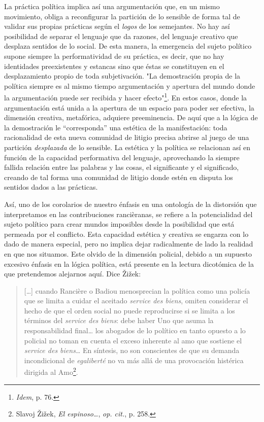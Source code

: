 \documentclass{book}
\begin{document}
La práctica política implica así una argumentación que, en un mismo
movimiento, obliga a reconfigurar la partición de lo sensible de forma
tal de validar sus propias prácticas según el \emph{logos} de los
semejantes. No hay así posibilidad de separar el lenguaje que da
razones, del lenguaje creativo que desplaza sentidos de lo social. De
esta manera, la emergencia del sujeto político supone siempre la
performatividad de su práctica, es decir, que no hay identidades
preexistentes y estancas sino que éstas se constituyen en el
desplazamiento propio de toda subjetivación. "La demostración propia de
la política siempre es al mismo tiempo argumentación y apertura del
mundo donde la argumentación puede ser recibida y hacer
efecto"\footnote{\emph{Idem}, p. 76.}. En estos casos, donde la
argumentación está unida a la apertura de un espacio para poder ser
efectiva, la dimensión creativa, metafórica, adquiere preeminencia. De
aquí que a la lógica de la demostración le ``corresponda'' una estética
de la manifestación: toda racionalidad de esta nueva comunidad de
litigio precisa abrirse al juego de una partición \emph{desplazada} de
lo sensible. La estética y la política se relacionan así en función de
la capacidad performativa del lenguaje, aprovechando la siempre fallida
relación entre las palabras y las cosas, el significante y el
significado, creando de tal forma una comunidad de litigio donde estén
en disputa los sentidos dados a las prácticas.

Así, uno de los corolarios de nuestro énfasis en una ontología de la
distorsión que interpretamos en las contribuciones rancièranas, se
refiere a la potencialidad del sujeto político para crear mundos
imposibles desde la posibilidad que está permeada por el conflicto. Esta
capacidad estética y creativa se engarza con lo dado de manera especial,
pero no implica dejar radicalmente de lado la realidad en que nos
situamos. Este olvido de la dimensión policial, debido a un supuesto
excesivo énfasis en la lógica política, está presente en la lectura
dicotómica de la que pretendemos alejarnos aquí. Dice Žižek:

\begin{quote}
{[}\ldots{]} cuando Rancière o Badiou menosprecian la política como una
policía que se limita a cuidar el aceitado \emph{service des biens},
omiten considerar el hecho de que el orden social no puede reproducirse
si se limita a los términos del \emph{service des biens}: debe haber Uno
que asuma la responsabilidad final\ldots{} los abogados de lo político
en tanto opuesto a lo policial no toman en cuenta el exceso inherente al
amo que sostiene el \emph{service des biens}\ldots{} En síntesis, no son
conscientes de que su demanda incondicional de \emph{egaliberté} no va
más allá de una provocación histérica dirigida al Amo\footnote{Slavoj
  Žižek, \emph{El espinoso\ldots{}}, \emph{op. cit.}, p. 258.}.
\end{quote}
\end{document}
